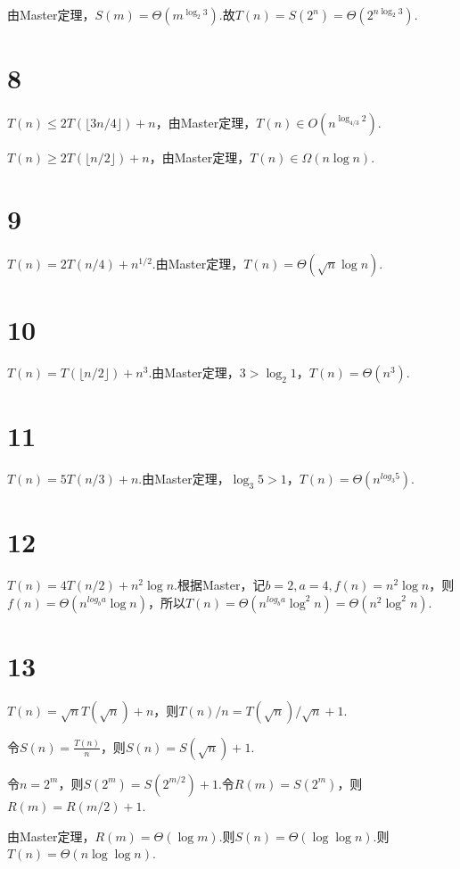 \documentclass{ctexart}
\begin{document}
由Master定理，$S(m) = \Theta\left( m^{\log_2 3} \right)$.故$T(n) = S(2^n) = \Theta \left( 2^{n\log_2 3} \right)$.


\section*{8}
$T(n) \le 2T\left(\lfloor 3n/4 \rfloor \right) + n$，由Master定理，$T(n) \in O\left(n^{\log_{4/3} 2} \right)$.

$T(n) \ge 2T\left( \lfloor n/2 \rfloor \right)+n$，由Master定理，$T(n)\in \Omega(n\log n)$.


\section*{9}
$T(n) = 2T(n/4) + n^{1/2}$.由Master定理，$T(n)=\Theta(\sqrt{n}\log n)$.


\section*{10}
$T(n)=T(\lfloor n/2\rfloor ) + n^3$.由Master定理，$3>\log_2 1$，$T(n)=\Theta(n^3)$.


\section*{11}
$T(n)=5T(n/3) + n$.由Master定理，$\log_3 5 > 1$，$T(n) = \Theta(n^{log_3 5})$.


\section*{12}
$T(n)=4T(n/2)+n^2\log n$.根据Master，记$b=2,a=4,f(n)=n^2\log n$，则$f(n)=\Theta(n^{log_b a} \log n )$，所以$T(n)=\Theta(n^{log_b a} \log^2 n)=\Theta(n^{2} \log^2 n)$.


\section*{13}
$T(n)=\sqrt{n}T(\sqrt{n})+n$，则$T(n)/n = T(\sqrt{n})/\sqrt{n} + 1$.

令$S(n)=\frac{T(n)}{n}$，则$S(n)=S(\sqrt{n})+1$.

令$n=2^m$，则$S(2^m)=S(2^{m/2})+1$.令$R(m)=S(2^m)$，则$R(m)=R(m/2)+1$.

由Master定理，$R(m)=\Theta(\log m)$.则$S(n)=\Theta(\log \log n)$.则$T(n)=\Theta(n\log \log n)$.
\end{document}
